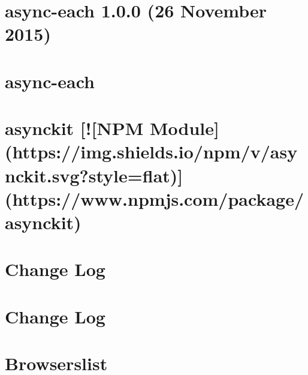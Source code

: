 \documentclass[twoside]{book}
\newcommand{\+}{\discretionary{\mbox{\scriptsize$\hookleftarrow$}}{}{}}
\begin{document}
\chapter{async-\/each 1.0.0 (26 November 2015)}
\label{md__c_1_workspace_demo_src_main_script_node_modules_async-each__c_h_a_n_g_e_l_o_g}

\chapter{async-\/each}
\label{md__c_1_workspace_demo_src_main_script_node_modules_async-each__r_e_a_d_m_e}

\chapter{asynckit \mbox{[}!\mbox{[}N\+PM Module\mbox{]}(https\+://img.shields.\+io/npm/v/asynckit.svg?style=flat)\mbox{]}(https\+://www.npmjs.\+com/package/asynckit)}
\label{md__c_1_workspace_demo_src_main_script_node_modules_asynckit__r_e_a_d_m_e}

\chapter{Change Log}
\label{md__c_1_workspace_demo_src_main_script_node_modules_autoprefixer__c_h_a_n_g_e_l_o_g}

\chapter{Change Log}
\label{md__c_1_workspace_demo_src_main_script_node_modules_autoprefixer_node_modules_browserslist__c_h_a_n_g_e_l_o_g}

\chapter{Browserslist}
\label{md__c_1_workspace_demo_src_main_script_node_modules_autoprefixer_node_modules_browserslist__r_e_a_d_m_e}

\end{document}

